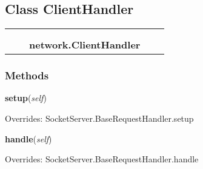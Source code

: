 

\subsection{Class ClientHandler}

    \label{network:ClientHandler}
\begin{tabular}{cccccc}
\multicolumn{2}{r}{\settowidth{\BCL}{SocketServer.BaseRequestHandler}\multirow{2}{\BCL}{SocketServer.BaseRequestHandler}}
&&
  \\\cline{3-3}
  &&\multicolumn{1}{c|}{}
&&
  \\
&&\multicolumn{2}{l}{\textbf{network.ClientHandler}}
\end{tabular}



  \subsubsection{Methods}

    \vspace{0.5ex}

\hspace{.8\funcindent}\begin{boxedminipage}{\funcwidth}

    \raggedright \textbf{setup}(\textit{self})

\setlength{\parskip}{2ex}
\setlength{\parskip}{1ex}
      Overrides: SocketServer.BaseRequestHandler.setup

    \end{boxedminipage}

    \vspace{0.5ex}

\hspace{.8\funcindent}\begin{boxedminipage}{\funcwidth}

    \raggedright \textbf{handle}(\textit{self})

\setlength{\parskip}{2ex}
\setlength{\parskip}{1ex}
      Overrides: SocketServer.BaseRequestHandler.handle

    \end{boxedminipage}

